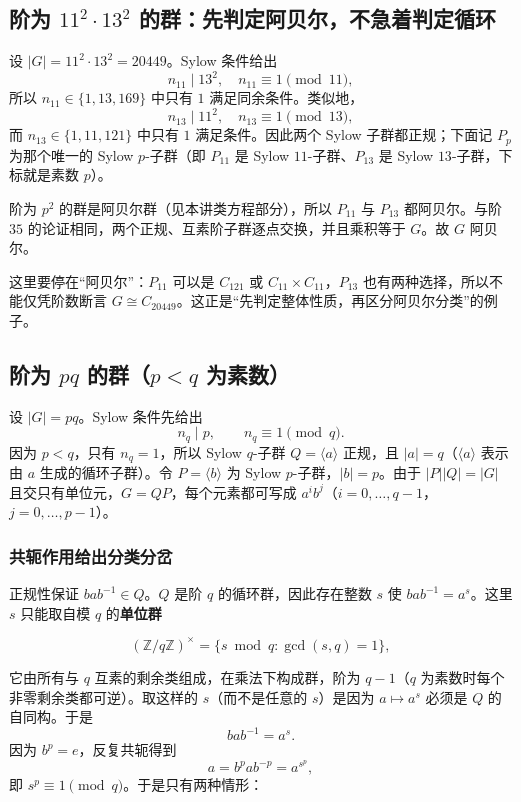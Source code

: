 \subsection{阶为 $11^2\cdot13^2$ 的群：先判定阿贝尔，不急着判定循环}


设 $|G|=11^2\cdot13^2=20449$。Sylow 条件给出
\[
 n_{11}\mid13^2,\quad n_{11}\equiv1\pmod{11},
\]
所以 $n_{11}\in\{1,13,169\}$ 中只有 $1$ 满足同余条件。类似地，
\[
 n_{13}\mid11^2,\quad n_{13}\equiv1\pmod{13},
\]
而 $n_{13}\in\{1,11,121\}$ 中只有 $1$ 满足条件。因此两个 Sylow 子群都正规；下面记 $P_p$ 为那个唯一的 Sylow $p$-子群（即 $P_{11}$ 是 Sylow $11$-子群、$P_{13}$ 是 Sylow $13$-子群，下标就是素数 $p$）。

阶为 $p^2$ 的群是阿贝尔群（见本讲类方程部分），所以 $P_{11}$ 与 $P_{13}$ 都阿贝尔。与阶 $35$ 的论证相同，两个正规、互素阶子群逐点交换，并且乘积等于 $G$。故 $G$ 阿贝尔。

这里要停在“阿贝尔”：$P_{11}$ 可以是 $C_{121}$ 或 $C_{11}\times C_{11}$，$P_{13}$ 也有两种选择，所以不能仅凭阶数断言 $G\cong C_{20449}$。这正是“先判定整体性质，再区分阿贝尔分类”的例子。

\subsection{阶为 $pq$ 的群（$p<q$ 为素数）}


设 $|G|=pq$。Sylow 条件先给出
\[
 n_q\mid p,\qquad n_q\equiv1\pmod q.
\]
因为 $p<q$，只有 $n_q=1$，所以 Sylow $q$-子群 $Q=\langle a\rangle$ 正规，且 $|a|=q$（$\langle a\rangle$ 表示由 $a$ 生成的循环子群）。令 $P=\langle b\rangle$ 为 Sylow $p$-子群，$|b|=p$。由于 $|P||Q|=|G|$ 且交只有单位元，$G=QP$，每个元素都可写成 $a^i b^j$（$i=0,\dots,q-1$，$j=0,\dots,p-1$）。

\subsubsection{共轭作用给出分类分岔}


正规性保证 $bab^{-1}\in Q$。$Q$ 是阶 $q$ 的循环群，因此存在整数 $s$ 使 $bab^{-1}=a^s$。这里 $s$ 只能取自模 $q$ 的\textbf{单位群}

\[
(\mathbb Z/q\mathbb Z)^\times=\{s\bmod q:\gcd(s,q)=1\},
\]

它由所有与 $q$ 互素的剩余类组成，在乘法下构成群，阶为 $q-1$（$q$ 为素数时每个非零剩余类都可逆）。取这样的 $s$（而不是任意的 $s$）是因为 $a\mapsto a^s$ 必须是 $Q$ 的自同构。于是
\[
bab^{-1}=a^s.
\]
因为 $b^p=e$，反复共轭得到
\[
a=b^pab^{-p}=a^{s^p},
\]
即 $s^p\equiv1\pmod q$。于是只有两种情形：

